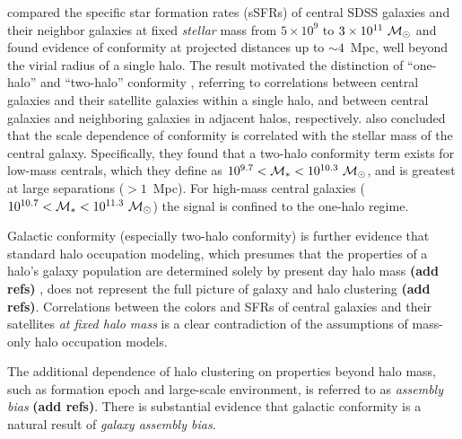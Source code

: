 \citet{Kauffmann13} compared the specific star formation rates (sSFRs) of central SDSS galaxies and their neighbor galaxies at fixed \emph{stellar} mass from $5\times10^9$ to $3\times10^{11}~\msun$ and found evidence of conformity at projected distances up to $\sim4$~Mpc, well beyond the virial radius of a single halo.
The \citet{Kauffmann13} result motivated the distinction of ``one-halo'' and ``two-halo'' conformity \citep*{Hearin15a}, referring to correlations between central galaxies and their satellite galaxies within a single halo, and between central galaxies and neighboring galaxies in adjacent halos, respectively.
\citet{Kauffmann13} also concluded that the scale dependence of conformity is correlated with the stellar mass of the central galaxy.
Specifically, they found that a two-halo conformity term exists for low-mass centrals, which they define as ${10^{9.7}<\mstar<10^{10.3}~\msun}$,
and is greatest at large separations ($>1$~Mpc).
For high-mass central galaxies (${10^{10.7}<\mstar<10^{11.3}~\msun}$) the signal is confined to the one-halo regime.

Galactic conformity (especially two-halo conformity) is further evidence that standard halo occupation modeling, which presumes that the properties of a halo's galaxy population are determined solely by present day halo mass {\bf(add refs)}
, does not represent the full picture of galaxy and halo clustering {\bf(add refs)}.
Correlations between the colors and SFRs of central galaxies and their satellites \emph{at fixed halo mass} is a clear contradiction of the assumptions of mass-only halo occupation models.

The additional dependence of halo clustering on properties beyond halo mass, such as formation epoch and large-scale environment, is referred to as \emph{assembly bias} {\bf(add refs)}.
There is substantial evidence that galactic conformity is a natural result of \emph{galaxy assembly bias}.

